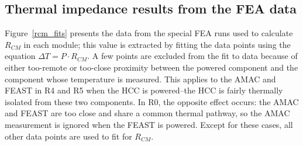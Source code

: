 \clearpage

\subsection{Thermal impedance results from the FEA data}

Figure~\ref{rcm_fits} presents the data from the special FEA runs used to calculate $R_{CM}$ in each
module; this value is extracted by fitting the data points using the equation
$\Delta T= P\cdot R_{CM}$. A few points are excluded from the fit to data because of either too-remote
or too-close
proximity between the powered component and the component whose temperature is measured. 
This applies to the AMAC and FEAST in R4 and R5 when the HCC is powered--the HCC is fairly thermally 
isolated from these two components. In R0, the opposite effect occurs: the AMAC and FEAST are too
close and share a common thermal pathway, so the AMAC measurement is ignored when the FEAST is powered.
Except for these cases, all other data points are used to fit for $R_{CM}$.

